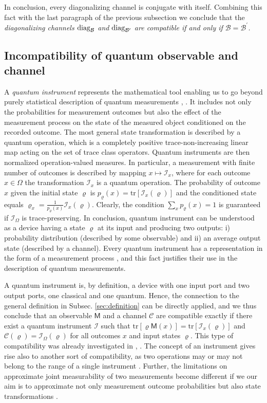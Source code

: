 \documentclass[12pt]{iopart}
\theoremstyle{definition}
\renewcommand{\tr}[1]{\textrm{tr}\left[#1\right]} %
\newcommand{\Mo}{\mathsf{M}}%
\newcommand{\Cc}{\mathcal{C}} %
\newcommand{\Ii}{\mathcal{I}}
\begin{document}
{In conclusion, every diagonalizing channel is conjugate with itself. 
Combining this fact with the last paragraph of the previous subsection 
we conclude that the \emph{diagonalizing channels ${\rm diag}_{\mathcal{B}}$ 
and ${\rm diag}_{\mathcal{B^\prime}}$ are  compatible if and only if $\mathcal{B} = \mathcal{B^\prime}$.}

\subsection{Incompatibility of quantum observable and channel}

A \emph{quantum instrument} represents the mathematical tool enabling us to go beyond purely statistical description of quantum measurements \cite{OQP97}, \cite{MLQT12}. 
It includes not only the probabilities for measurement outcomes but also the effect of the measurement process on the state of the measured object
conditioned on the recorded outcome. 
The most general state transformation
is described by a quantum operation, which is a completely positive 
trace-non-increasing linear map acting on the set of trace class 
operators. 
Quantum instruments are then normalized operation-valued measures. 
In particular, a measurement with finite number of outcomes is described 
by mapping $x\mapsto\Ii_x$, where for each outcome $x\in\Omega$ 
the transformation $\Ii_x$ is a quantum operation. The probability of outcome $x$ given
the initial state $\varrho$ is $p_\varrho(x)=\tr{\Ii_x(\varrho)}$ and the
conditioned state equals 
$\varrho_x=\frac{1}{p_\varrho(x)}\Ii_x(\varrho)$. 
Clearly, the condition $\sum_x p_\varrho(x)=1$ is guaranteed if $\Ii_\Omega$ 
is trace-preserving. 
In conclusion, quantum instrument can be understood as a device
having a state $\varrho$ at its input and producing two outputs: 
i) probability distribution (described by some observable) and 
ii) an average output state (described by a channel). 
Every quantum instrument has a representation in the form of a measurement process \cite{Ozawa84}, and this fact justifies their use in the description of quantum measurements. 

A quantum instrument is, by definition, a device with one input port and two output ports, one classical and one quantum.
Hence, the connection to the general definition in Subsec. \ref{sec:definition} can be directly applied, and we thus conclude that an observable $\Mo$ and a channel $\Cc$ are compatible exactly if there exist a quantum instrument $\Ii$ such that $\tr{\varrho\Mo(x)}=\tr{\Ii_x(\varrho)}$ and $\Cc(\varrho)=\Ii_\Omega(\varrho)$ for all outcomes $x$ and input states $\varrho$.
This type of compatibility was already investigated in \cite{Ozawa84}, \cite{Ozawa85}.  
The concept of an instrument gives rise also to another sort of compatibility, as two operations may or may not belong to the range of a single instrument \cite{HeReStZi09}.
Further, the limitations on approximate joint measurability of two measurements become different if we our aim is to approximate not only measurement outcome probabilities but also state transformations \cite{HeJiReZi10}.

}
\end{document}
